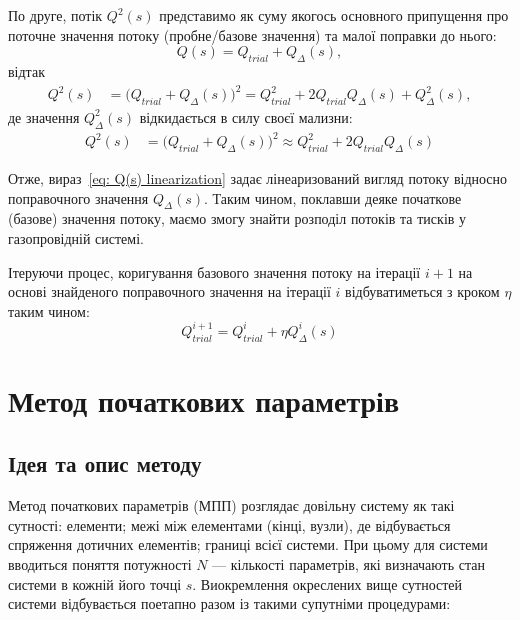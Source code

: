 \documentclass{mathreport}
\begin{document}
По друге, потік $Q^2(s)$ представимо як суму якогось основного припущення про поточне значення потоку (пробне/базове значення) та малої поправки до нього:
\begin{equation}
    Q(s) = Q_{trial} + Q_{\Delta}(s),
\end{equation}
відтак 
\begin{align}
    Q^2(s) & = \bigl( Q_{trial} + Q_{\Delta}(s) \bigr)^2 = Q^2_{trial} + 2Q_{trial}Q_{\Delta}(s) + Q^2_{\Delta}(s),
\end{align}
де значення $Q^2_{\Delta}(s)$ відкидається в силу своєї мализни:
\begin{align}
    Q^2(s) & = \bigl( Q_{trial} + Q_{\Delta}(s) \bigr)^2 \approx Q^2_{trial} + 2Q_{trial}Q_{\Delta}(s) \label{eq: Q(s) linearization}
\end{align}

Отже, вираз~\eqref{eq: Q(s) linearization} задає лінеаризований вигляд потоку відносно поправочного значення $Q_{\Delta}(s)$. Таким чином, поклавши деяке початкове (базове) значення потоку, маємо змогу знайти розподіл потоків та тисків у газопровідній системі. 

Ітеруючи процес, коригування базового значення потоку на ітерації $i+1$ на основі знайденого поправочного значення на ітерації $i$ відбуватиметься з кроком $\eta$ таким чином:
\begin{equation}\label{eq: Q(s) iterative process}
    Q_{trial}^{i+1} = Q_{trial}^{i} + \eta Q^{i}_{\Delta}(s)
\end{equation}

\section{Метод початкових параметрів}

\subsection*{Ідея та опис методу}

Метод початкових параметрів (МПП) розглядає довільну систему як такі сутності: елементи; межі між елементами (кінці, вузли), де відбувається спряження дотичних елементів; границі всієї системи. При цьому для системи вводиться поняття потужності $N$ --- кількості параметрів, які визначають стан системи в кожній його точці $s$. Виокремлення окреслених вище сутностей системи відбувається поетапно разом із такими супутніми процедурами:
\end{document}
